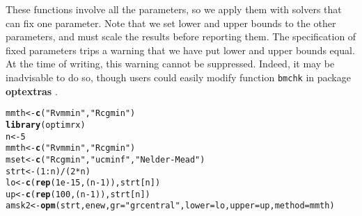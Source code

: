 \documentclass[11pt]{article}\usepackage[]{graphicx}\usepackage[]{color}
\makeatletter
\newcommand{\hlnum}[1]{\textcolor[rgb]{0.686,0.059,0.569}{#1}}%
\newcommand{\hlstr}[1]{\textcolor[rgb]{0.192,0.494,0.8}{#1}}%
\newcommand{\hlopt}[1]{\textcolor[rgb]{0,0,0}{#1}}%
\newcommand{\hlstd}[1]{\textcolor[rgb]{0.345,0.345,0.345}{#1}}%
\newcommand{\hlkwb}[1]{\textcolor[rgb]{0.69,0.353,0.396}{#1}}%
\newcommand{\hlkwc}[1]{\textcolor[rgb]{0.333,0.667,0.333}{#1}}%
\newcommand{\hlkwd}[1]{\textcolor[rgb]{0.737,0.353,0.396}{\textbf{#1}}}%
\newenvironment{kframe}{%
 \def\at@end@of@kframe{}%
 \ifinner\ifhmode%
  \def\at@end@of@kframe{\end{minipage}}%
  \begin{minipage}{\columnwidth}%
 \fi\fi%
 \def\FrameCommand##1{\hskip\@totalleftmargin \hskip-\fboxsep
 \colorbox{shadecolor}{##1}\hskip-\fboxsep
     \hskip-\linewidth \hskip-\@totalleftmargin \hskip\columnwidth}%
 \MakeFramed {\advance\hsize-\width
   \@totalleftmargin\z@ \linewidth\hsize
   \@setminipage}}%
 {\par\unskip\endMakeFramed%
 \at@end@of@kframe}
\newenvironment{knitrout}{}{} %
\newcommand{\B}[1]{{\bf #1 \rm}}
\newcommand{\code}[1]{{\tt#1}}
\makeatother
\begin{document}
These functions involve all the parameters, so we apply them with solvers that can fix
one parameter. Note that we set lower and upper bounds to the other parameters, and must
scale the results before reporting them. The specification of fixed parameters trips a 
warning that we have put lower and upper bounds equal. At the time of writing, this warning
cannot be suppressed. Indeed, it may be inadvisable to do so, though users could easily 
modify function \code{bmchk} in package \B{optextras}. 

\begin{knitrout}\scriptsize
{}\color{fgcolor}\begin{kframe}
\begin{alltt}
\hlstd{mmth} \hlkwb{<-} \hlkwd{c}\hlstd{(}\hlstr{"Rvmmin"}\hlstd{,} \hlstr{"Rcgmin"}\hlstd{)}
\hlkwd{library}\hlstd{(optimrx)}
\hlstd{n} \hlkwb{<-} \hlnum{5}
\hlstd{mmth}\hlkwb{<-}\hlkwd{c}\hlstd{(}\hlstr{"Rvmmin"}\hlstd{,} \hlstr{"Rcgmin"}\hlstd{)}
\hlstd{mset}\hlkwb{<-}\hlkwd{c}\hlstd{(}\hlstr{"Rcgmin"}\hlstd{,} \hlstr{"ucminf"}\hlstd{,} \hlstr{"Nelder-Mead"}\hlstd{)}
\hlstd{strt} \hlkwb{<-} \hlstd{(}\hlnum{1}\hlopt{:}\hlstd{n)}\hlopt{/}\hlstd{(}\hlnum{2}\hlopt{*}\hlstd{n)}
\hlstd{lo} \hlkwb{<-} \hlkwd{c}\hlstd{(}\hlkwd{rep}\hlstd{(}\hlnum{1e-15}\hlstd{, (n}\hlopt{-}\hlnum{1}\hlstd{)),strt[n])}
\hlstd{up} \hlkwb{<-} \hlkwd{c}\hlstd{(}\hlkwd{rep}\hlstd{(}\hlnum{100}\hlstd{, (n}\hlopt{-}\hlnum{1}\hlstd{)),strt[n])}
\hlstd{amsk2} \hlkwb{<-} \hlkwd{opm}\hlstd{(strt, enew,} \hlkwc{gr}\hlstd{=}\hlstr{"grcentral"}\hlstd{,} \hlkwc{lower}\hlstd{=lo,} \hlkwc{upper}\hlstd{=up,} \hlkwc{method}\hlstd{=mmth)}
\end{alltt}


{\ttfamily\noindent\color{warningcolor}{\#\# Warning in bmchk(par, lower = lower, upper = upper): Masks (fixed parameters) set by bmchk due to tight bounds. CAUTION!!}}

{\ttfamily\noindent\color{warningcolor}{\#\# Warning in bmchk(par, lower = lower, upper = upper): Masks (fixed parameters) set by bmchk due to tight bounds. CAUTION!!}}


\end{kframe}
\end{knitrout}
\end{document}
